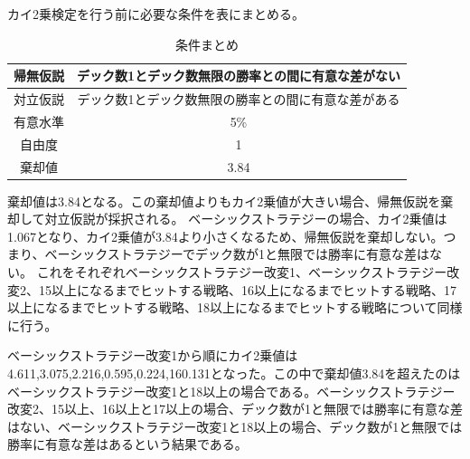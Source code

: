 カイ2乗検定を行う前に必要な条件を表\label{hypothesis2}にまとめる。
\begin{table}[H]
 \caption{条件まとめ\label{hypothesis2}}
 \begin{center}
  \begin{tabular}{|c|c|}
  \hline 帰無仮説 & デック数1とデック数無限の勝率との間に有意な差がない \\
  \hline 対立仮説 & デック数1とデック数無限の勝率との間に有意な差がある \\
  \hline 有意水準 & 5\% \\
  \hline 自由度 & 1 \\
  \hline 棄却値 & 3.84 \\
  \hline 
  \end{tabular}
 \end{center}
\end{table}
棄却値は3.84となる。この棄却値よりもカイ2乗値が大きい場合、帰無仮説を棄却して対立仮説が採択される。
ベーシックストラテジーの場合、カイ2乗値は1.067となり、カイ2乗値が3.84より小さくなるため、帰無仮説を棄却しない。つまり、ベーシックストラテジーでデック数が1と無限では勝率に有意な差はない。
これをそれぞれベーシックストラテジー改変1、ベーシックストラテジー改変2、15以上になるまでヒットする戦略、16以上になるまでヒットする戦略、17以上になるまでヒットする戦略、18以上になるまでヒットする戦略について同様に行う。

ベーシックストラテジー改変1から順にカイ2乗値は4.611,3.075,2.216,0.595,0.224,160.131となった。この中で棄却値3.84を超えたのはベーシックストラテジー改変1と18以上の場合である。ベーシックストラテジー改変2、15以上、16以上と17以上の場合、デック数が1と無限では勝率に有意な差はない、ベーシックストラテジー改変1と18以上の場合、デック数が1と無限では勝率に有意な差はあるという結果である。

